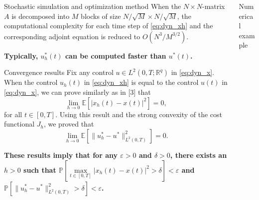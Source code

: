 \documentclass[mathserif]{beamer}
\begin{document}
\begin{frame}
\begin{columns}[T]
\begin{column}{.45\textwidth}
\begin{block}{Stochastic simulation and optimization method}
When the $N \times N$-matrix $A$ is decomposed into $M$ blocks of size $N/\sqrt{M} \times N/\sqrt{M}$, the computational complexity for each time step of \eqref{eq:dyn_xh} and the corresponding adjoint equation is reduced to $O(N^3/M^{3/2})$. 
\begin{center}
\textbf{Typically, $u^*_h(t)$ can be computed faster than $u^*(t)$. }
\end{center}
      \end{block}    
      
      \begin{block}{Convergence results}
      Fix any control $u \in L^2(0,T; \mathbb{R}^q)$ in \eqref{eq:dyn_x}. When the control $u_h(t)$ in \eqref{eq:dyn_xh} is equal to the control $u(t)$ in \eqref{eq:dyn_x}, we can prove similarly as in [3] that 
      \begin{equation}
      \lim_{h \rightarrow 0}\mathbb{E}\left[ |x_h(t) - x(t) |^2\right] = 0, \label{eq:conv_x}
      \end{equation}
      for all $t \in [0,T]$. 
      Using this result and the strong convexity of the cost functional $J_h$, we proved that
      \begin{equation}
      \lim_{h \rightarrow 0} \mathbb{E}\left[ \| u^*_h - u^* \|_{L^2(0,T)}^2 \right] = 0. \label{eq:conv_control}
      \end{equation}

      \begin{center}      
      \vspace{0.5cm}
     \textbf{These results imply that for any $\varepsilon > 0$ and $\delta > 0$, there exists an $h>0$ such that $\mathbb{P}[ \max\limits_{t \in [0,T]} | x_h(t) - x(t) |^2 > \delta] < \varepsilon$ and $\mathbb{P}[\|u^*_h - u^* \|_{L^2(0,T)}^2 > \delta] < \varepsilon$. }
      \end{center}
      
      \end{block}      
    \end{column}
    
    \begin{column}{.45\textwidth}
    \vspace{-0.15cm}
    \begin{block}{Numerical example}
    

\end{block}
\end{column}
\end{columns}
\end{frame}
\end{document}
